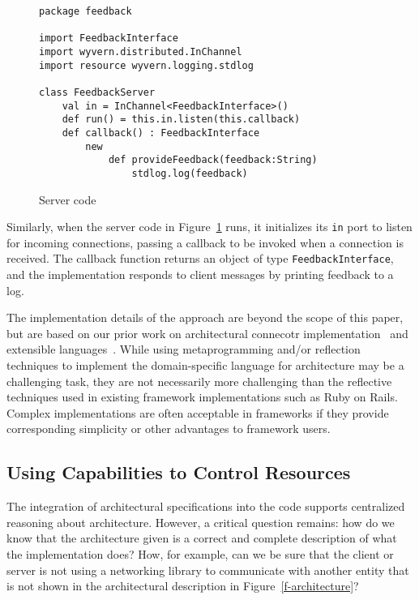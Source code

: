 \documentclass[runningheads]{llncs}
\begin{document}
\begin{sloppypar}
\begin{figure}[t]
\begin{lstlisting}
package feedback

import FeedbackInterface
import wyvern.distributed.InChannel
import resource wyvern.logging.stdlog

class FeedbackServer
    val in = InChannel<FeedbackInterface>()
    def run() = this.in.listen(this.callback)
    def callback() : FeedbackInterface
        new
            def provideFeedback(feedback:String)
                stdlog.log(feedback)

\end{lstlisting}
\caption{Server code}
\label{f-server}
\end{figure}


Similarly, when the server code in Figure~\ref{f-server} runs, it initializes its \texttt{in} port to listen for incoming connections, passing a callback to be invoked when a connection is received.  The callback function returns an object of type \texttt{FeedbackInterface}, and the implementation responds to client messages by printing feedback to a log.


The implementation details of the approach are beyond the scope of this paper, but are based on our prior work on architectural connecotr implementation~\cite{ASCN03} and extensible languages~\cite{TSLs-ECOOP14}.  While using metaprogramming and/or reflection techniques to implement the domain-specific language for architecture may be a challenging task, they are not necessarily more challenging than the reflective techniques used in existing framework implementations such as Ruby on Rails.  Complex implementations are often acceptable in frameworks if they provide corresponding simplicity or other advantages to framework users.


\subsection{Using Capabilities to Control Resources}

The integration of architectural specifications into the code supports centralized reasoning about architecture.  However, a critical question remains: how do we know that the architecture given is a correct and complete description of what the implementation does?  How, for example, can we be sure that the client or server is not using a networking library to communicate with another entity that is not shown in the architectural description in Figure~\ref{f-architecture}?


\end{sloppypar}
\end{document}
